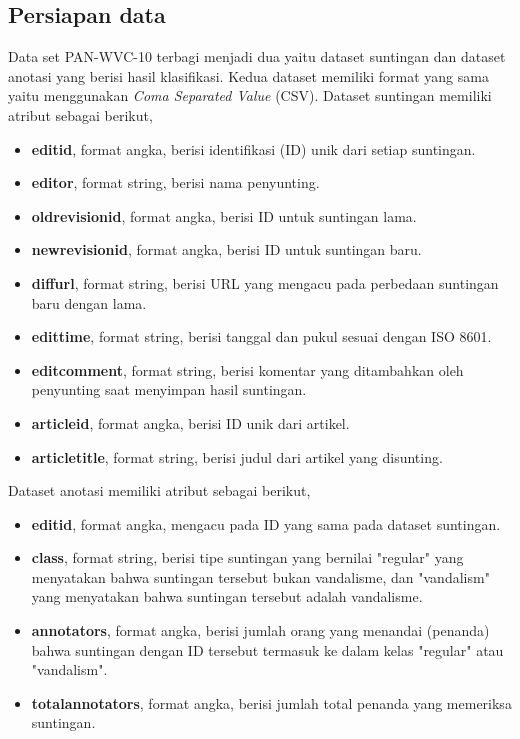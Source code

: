 \subsection{Persiapan data}

Data set PAN-WVC-10 terbagi menjadi dua yaitu dataset suntingan dan dataset
anotasi yang berisi hasil klasifikasi.
Kedua dataset memiliki format yang sama yaitu menggunakan \textit{Coma
Separated Value} (CSV).
Dataset suntingan memiliki atribut sebagai berikut,

\begin{itemize}
	\item \textbf{editid}, format angka, berisi identifikasi (ID) unik dari setiap suntingan.
	\item \textbf{editor}, format string, berisi nama penyunting.
	\item \textbf{oldrevisionid}, format angka, berisi ID untuk suntingan lama.
	\item \textbf{newrevisionid}, format angka, berisi ID untuk suntingan baru.
	\item \textbf{diffurl}, format string, berisi URL yang mengacu pada perbedaan suntingan baru dengan lama.
	\item \textbf{edittime}, format string, berisi tanggal dan pukul sesuai dengan ISO 8601.
	\item \textbf{editcomment}, format string, berisi komentar yang ditambahkan oleh penyunting saat menyimpan hasil suntingan.
	\item \textbf{articleid}, format angka, berisi ID unik dari artikel.
	\item \textbf{articletitle}, format string, berisi judul dari artikel yang disunting.
\end{itemize}

Dataset anotasi memiliki atribut sebagai berikut,
\begin{itemize}
	\item \textbf{editid}, format angka, mengacu pada ID yang sama pada
	dataset suntingan.
	\item \textbf{class}, format string, berisi tipe suntingan yang
	bernilai "regular" yang menyatakan bahwa suntingan tersebut bukan
	vandalisme, dan "vandalism" yang menyatakan bahwa suntingan tersebut
	adalah vandalisme.
	\item \textbf{annotators}, format angka, berisi jumlah orang yang
	menandai (penanda) bahwa suntingan dengan ID tersebut termasuk ke dalam
	kelas "regular" atau "vandalism".
	\item \textbf{totalannotators}, format angka, berisi jumlah total penanda yang memeriksa suntingan.
\end{itemize}


